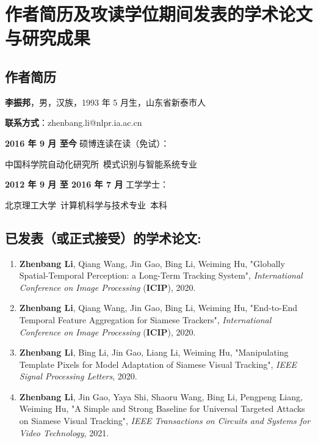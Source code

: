 \chapter{作者简历及攻读学位期间发表的学术论文与研究成果}

\section*{作者简历}

\textbf{李振邦}，男，汉族，1993 年 5 月生，山东省新泰市人

\textbf{联系方式}：zhenbang.li@nlpr.ia.ac.cn

\textbf{2016 年 9 月 至今} 硕博连读在读（免试）：

	中国科学院自动化研究所~模式识别与智能系统专业

\textbf{2012 年 9 月 至 2016 年 7 月} 工学学士：

	北京理工大学~计算机科学与技术专业~本科


\section*{已发表（或正式接受）的学术论文:}

{
\setlist[enumerate]{}%
\begin{enumerate}[nosep]
    \item \textbf{Zhenbang Li}, Qiang Wang, Jin Gao,  Bing Li, Weiming Hu, "Globally Spatial-Temporal Perception: a Long-Term Tracking System", \textit{International Conference on Image Processing} (\textbf{ICIP}), 2020.
    \item \textbf{Zhenbang Li}, Qiang Wang, Jin Gao,  Bing Li, Weiming Hu, "End-to-End Temporal Feature Aggregation for Siamese Trackers", \textit{International Conference on Image Processing} (\textbf{ICIP}), 2020.
    \item \textbf{Zhenbang Li}, Bing Li, Jin Gao, Liang Li, Weiming Hu, "Manipulating Template Pixels for Model Adaptation of Siamese Visual Tracking", \textit{IEEE Signal Processing Letters}, 2020.
    \item \textbf{Zhenbang Li}, Jin Gao, Yaya Shi, Shaoru Wang, Bing Li, Pengpeng Liang, Weiming Hu, "A Simple and Strong Baseline for Universal Targeted Attacks on Siamese Visual Tracking", \textit{IEEE Transactions on Circuits and Systems for Video Technology}, 2021.
\end{enumerate}
}

